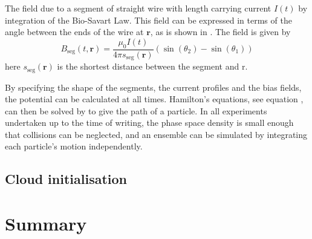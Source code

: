 The field due to a segment of straight wire with length carrying current $I(t)$
 by integration of the Bio-Savart Law.
This field can be expressed in terms of the angle between the ends of the wire
at $\mathbf{r}$, as is shown in . The field
is given by~\cite{Griffiths2017}
%
\begin{equation}
  B_\text{seg}(t, \mathbf{r}) = \frac{\mu_0 I(t)}{4\pi
  s_\text{seg}(\mathbf{r})} (\sin(\theta_2)  - \sin(\theta_1))
\end{equation}
here $s_\text{seg}(\mathbf{r})$ is the shortest distance between the segment
and $\mathrm{r}$.

By specifying the shape of the segments, the current profiles and the bias
fields, the potential can be calculated at all times. Hamilton's equations, see
equation , can then be solved by  to give the path of a
particle. In all \CaF experiments undertaken up to the time of writing, the
phase space density is small enough that collisions can be neglected, and an
ensemble can be simulated by integrating each particle's motion independently.

\subsection{Cloud initialisation}


\section{Summary}

